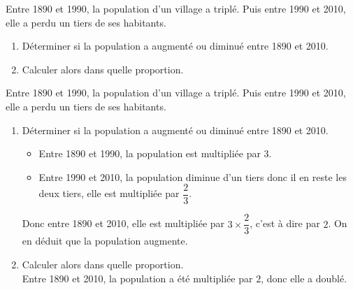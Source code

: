 \begin{exercice*}
    Entre 1890 et 1990, la population d'un village a triplé. Puis entre 1990 et 2010, elle a perdu un tiers de ses habitants.
    \begin{enumerate}
        \item Déterminer si la population a augmenté ou diminué entre 1890 et 2010.
        \item Calculer alors dans quelle proportion.
    \end{enumerate}
\end{exercice*}
\begin{corrige}
    Entre 1890 et 1990, la population d'un village a triplé. Puis entre 1990 et 2010, elle a perdu un tiers de ses habitants.
    
    \begin{enumerate}
        \item Déterminer si la population a augmenté ou diminué entre 1890 et 2010.\\
        {\red 
        \begin{itemize}
            \item Entre 1890 et 1990, la population est multipliée par 3.
            \item Entre 1990 et 2010, la population diminue d'un tiers donc il en reste les deux tiers, elle est multipliée par $\dfrac{2}{3}$.
        \end{itemize}
        Donc entre 1890 et 2010, elle est multipliée par $3\times\dfrac{2}{3}$, c'est à dire par $2$. On en déduit que la population augmente.
        }        
        \item Calculer alors dans quelle proportion.\\
        {\red Entre 1890 et 2010, la population a été multipliée par $2$, donc elle a doublé.}
    \end{enumerate}
\end{corrige}


